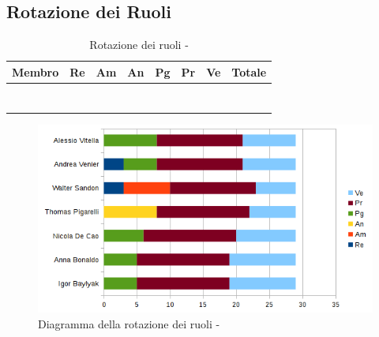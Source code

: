 \documentclass[12pt,a4paper]{article}
\begin{document}
\subsection{Rotazione dei Ruoli}

\begin{table}[h]
	\begin{center}
		\begin{tabular}{l r r r r r r r}
			\toprule
			\textbf{Membro}	&	\textbf{Re}	&	\textbf{Am}	& \textbf{An} & \textbf{Pg} & \textbf{Pr} & \textbf{Ve} & \textbf{Totale}\\
			\midrule
			\midrule
			\IB &  &  &  &  &  &  &  \\
			\midrule
			\AB &  &  &  &  &  &  &  \\
			\midrule
			\NDC &  &  &  &  &  &  &  \\
			\midrule
			\TP &  &  &  &  &  &  &  \\
			\midrule
			\WS &  &  &  &  &  &  &  \\
			\midrule
			\AVE &  &  &  &  &  &  &  \\
			\midrule
			\AVI &  &  &  &  &  &  &  \\
			\bottomrule
		\end{tabular}
		\caption{Rotazione dei ruoli - \FPDC}
	\end{center}
\end{table}

\begin{center}
	\begin{figure}[H]
		\centering		\includegraphics[width=\textwidth]{diagrammaBarreProgettazioneDettaglioCodificaRotazioneRuoli.png}
		\caption{Diagramma della rotazione dei ruoli - \FPDC}
	\end{figure}
\end{center}
\end{document}
